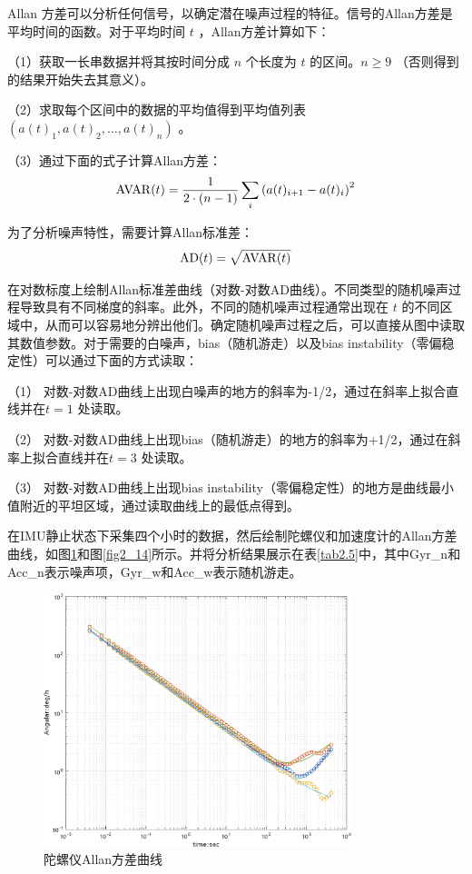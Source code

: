 Allan 方差可以分析任何信号，以确定潜在噪声过程的特征。信号的Allan方差是平均时间的函数。对于平均时间 $t$ ，Allan方差计算如下：

（1）获取一长串数据并将其按时间分成  $n$ 个长度为  $t$ 的区间。$n \geqslant 9 $ （否则得到的结果开始失去其意义）。

（2）求取每个区间中的数据的平均值得到平均值列表 $\left(a(t)_{1}, a(t)_{2}, \ldots, a(t)_{n}\right) $ 。 

（3）通过下面的式子计算Allan方差： 
\begin{equation}
\label{eqn:2.72}
\setlength{\abovedisplayskip}{6pt}
\setlength{\belowdisplayskip}{6pt}
\operatorname{AVAR}(t)=\frac{1}{2 \cdot(n-1)} \sum_{i}\left(a(t)_{i+1}-a(t)_{i}\right)^{2}
\end{equation}

为了分析噪声特性，需要计算Allan标准差：
\begin{equation}
\label{eqn:2.73}
\setlength{\abovedisplayskip}{6pt}
\setlength{\belowdisplayskip}{6pt}
\mathrm{AD}(t)=\sqrt{\mathrm{AVAR}(t)}
\end{equation}

在对数标度上绘制Allan标准差曲线（对数-对数AD曲线）。不同类型的随机噪声过程导致具有不同梯度的斜率。此外，不同的随机噪声过程通常出现在 $t$ 的不同区域中，从而可以容易地分辨出他们。确定随机噪声过程之后，可以直接从图中读取其数值参数。对于需要的白噪声，bias（随机游走）以及bias instability（零偏稳定性）可以通过下面的方式读取：

 （1） 对数-对数AD曲线上出现白噪声的地方的斜率为-1/2，通过在斜率上拟合直线并在$t=1$ 处读取。
 
 （2） 对数-对数AD曲线上出现bias（随机游走）的地方的斜率为+1/2，通过在斜率上拟合直线并在$t=3$ 处读取。
 
 （3） 对数-对数AD曲线上出现bias instability（零偏稳定性）的地方是曲线最小值附近的平坦区域，通过读取曲线上的最低点得到。

在IMU静止状态下采集四个小时的数据，然后绘制陀螺仪和加速度计的Allan方差曲线，如图\ref{fig2_13}和图\ref{fig2_14}所示。并将分析结果展示在表\ref{tab2.5}中，其中Gyr\_n和Acc\_n表示噪声项，Gyr\_w和Acc\_w表示随机游走。
\begin{figure}[!h]\setlength{\belowcaptionskip}{-12pt}
	\centering
	\includegraphics[width=0.8\textwidth]{figures/chapter2/fig2_13}
	\caption{陀螺仪Allan方差曲线}\label{fig2_13}
\end{figure}

